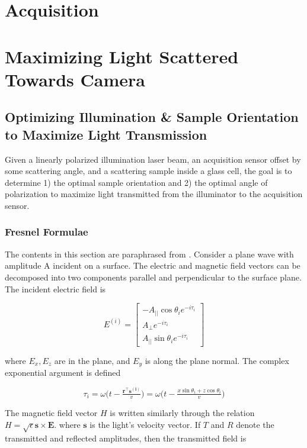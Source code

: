 \section{Acquisition}

\section{Maximizing Light Scattered Towards Camera}

\subsection{Optimizing Illumination \& Sample Orientation to Maximize Light Transmission}
Given a linearly polarized illumination laser beam, an acquisition sensor offset by some scattering angle, and a scattering sample inside a glass cell, the goal is to determine 1) the optimal sample orientation and 2) the optimal angle of polarization to maximize light transmitted from the illuminator to the acquisition sensor.

\subsubsection{Fresnel Formulae}
The contents in this section are paraphrased from \cite{born2013principles}. Consider a plane wave with amplitude A incident on a surface. The electric and magnetic field vectors can be decomposed into two components parallel and perpendicular to the surface plane. The incident electric field is

\begin{equation}
    E^{(i)} = 
    \begin{bmatrix}
        -A_{||} \cos{\theta_i} e^{-i \tau_i} \\
        A_\perp e^{-i \tau_i} \\
        A_{||} \sin{\theta_i} e^{-i \tau_i}
    \end{bmatrix}
\end{equation}

where $E_x, E_z$ are in the plane, and $E_y$ is along the plane normal. The complex exponential argument is defined

\begin{equation}
    \tau_i = \omega \big( t - \tfrac{\mathbf{r}^\intercal \mathbf{s^{(i)}}}{v} \big) = \omega \big( t - \tfrac{x \sin{\theta_i} + z \cos{\theta_i}}{v} \big)
\end{equation}

The magnetic field vector $H$ is written similarly through the relation $H = \sqrt{\epsilon} \mathbf{s} \times \mathbf{E}$.
where $\mathbf{s}$ is the light's velocity vector. If $T$ and $R$ denote the transmitted and reflected amplitudes, then the transmitted field is

